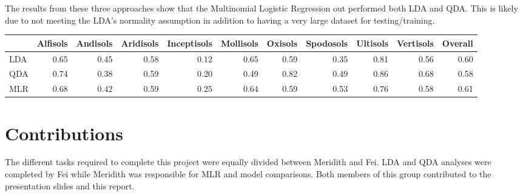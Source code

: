 \documentclass[]{article}
\begin{document}
The results from these three approaches show that the Multinomial
Logistic Regression out performed both LDA and QDA. This is likely due
to not meeting the LDA's normality assumption in addition to having a
very large dataset for testing/training.

\begin{longtable}[]{@{}lrrrrrrrrrr@{}}
\toprule
& Alfisols & Andisols & Aridisols & Inceptisols & Mollisols & Oxisols &
Spodosols & Ultisols & Vertisols & Overall\tabularnewline
\midrule
\endhead
LDA & 0.65 & 0.45 & 0.58 & 0.12 & 0.65 & 0.59 & 0.35 & 0.81 & 0.56 &
0.60\tabularnewline
QDA & 0.74 & 0.38 & 0.59 & 0.20 & 0.49 & 0.82 & 0.49 & 0.86 & 0.68 &
0.58\tabularnewline
MLR & 0.68 & 0.42 & 0.59 & 0.25 & 0.64 & 0.59 & 0.53 & 0.76 & 0.58 &
0.61\tabularnewline
\bottomrule
\end{longtable}

\section{Contributions}\label{contributions}

The different tasks required to complete this project were equally
divided between Meridith and Fei. LDA and QDA analyses were completed by
Fei while Meridith was responsible for MLR and model comparisons. Both
members of this group contributed to the presentation slides and this
report.
\end{document}

